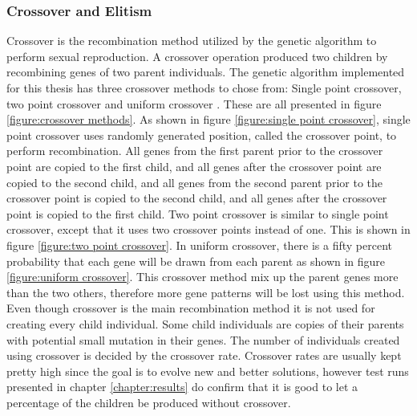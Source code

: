 \subsubsection{Crossover and Elitism}
Crossover is the recombination method utilized by the genetic algorithm to perform sexual reproduction. A crossover operation produced two children by recombining genes of two parent individuals. The genetic algorithm implemented for this thesis has three crossover methods to chose from: Single point crossover, two point crossover and uniform crossover \citep{Magalhaes-Mendes}. These are all presented in figure \ref{figure:crossover methods}. As shown in figure \ref{figure:single point crossover}, single point crossover uses randomly generated position, called the crossover point, to perform recombination. All genes from the first parent prior to the crossover point are copied to the first child, and all genes after the crossover point are copied to the second child, and all genes from the second parent prior to the crossover point is copied to the second child, and all genes after the crossover point is copied to the first child. Two point crossover is similar to single point crossover, except that it uses two crossover points instead of one. This is shown in figure \ref{figure:two point crossover}. In uniform crossover, there is a fifty percent probability that each gene will be drawn from each parent as shown in figure \ref{figure:uniform crossover}. This crossover method mix up the parent genes more than the two others, therefore more gene patterns will be lost using this method. Even though crossover is the main recombination method it is not used for creating every child individual. Some child individuals are copies of their parents with potential small mutation in their genes. The number of individuals created using crossover is decided by the crossover rate. Crossover rates are usually kept pretty high since the goal is to evolve new and better solutions, however test runs presented in chapter \ref{chapter:results} do confirm that it is good to let a percentage of the children be produced without crossover. \\


